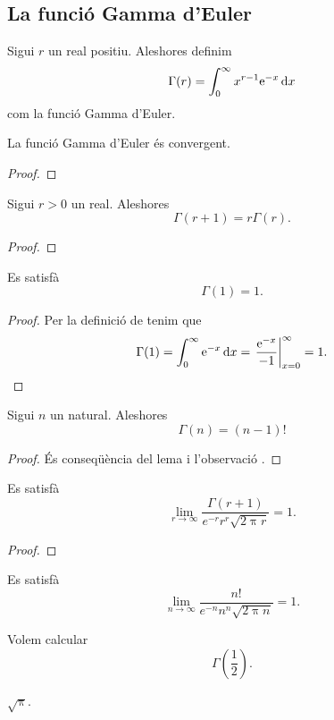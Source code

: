 \documentclass[../../Main.tex]{subfiles}
\begin{document}
	\subsection{La funció Gamma d'Euler}
	\begin{definition}
		\label{def:Gamma d'Euler}
		Sigui \(r\) un real positiu. Aleshores definim
		\[\Gamma(r)=\int_{0}^{\infty}x^{r-1}\mathrm{e}^{-x}\mathop{}\!\mathrm{d} x\]
		com la funció Gamma d'Euler.
	\end{definition}
	\begin{theorem}
		\label{thm:la funció Gamma d'Euler és convergent}
		La funció Gamma d'Euler és convergent.
		\begin{proof}
		\end{proof}
	\end{theorem}
	\begin{lemma} %
		\label{lema:la Gamma d'Euler es comporta com un factorial amb reals}
		Sigui \(r>0\) un real. Aleshores
		\[\Gamma(r+1)=r\Gamma(r).\]
		\begin{proof}
		\end{proof}
	\end{lemma}
	\begin{observation}
		\label{obs:valor n=1 per la Gamma d'Euler}
		Es satisfà
		\[\Gamma(1)=1.\]
		\begin{proof} %
			Per la definició de  tenim que
			\[\Gamma(1)=\int_{0}^{\infty}\e^{-x}\diff x=\left.\frac{\e^{-x}}{-1}\right\vert_{x=0}^{\infty}=1.\qedhere\]
		\end{proof}
	\end{observation}
	\begin{lemma} %
		\label{lema:la Gamma d'Euler es comporta com un factorial}
		Sigui \(n\) un natural. Aleshores
		\[\Gamma(n)=(n-1)!\]
		\begin{proof}
			És conseqüència del lema  i l'observació .
		\end{proof}
	\end{lemma}
	\begin{theorem}
		\label{thm:fórmula d'Stirling}
		Es satisfà
		\[\lim_{r\to\infty}\frac{\Gamma(r+1)}{e^{-r}r^{r}\sqrt{2\uppi r}}=1.\]
		\begin{proof}
		\end{proof}
	\end{theorem}
	\begin{corollary}
		\label{cor:fórmula d'Stirling}
		Es satisfà
		\[\lim_{n\to\infty}\frac{n!}{e^{-n}n^{n}\sqrt{2\uppi n}}=1.\]
	\end{corollary}
	\begin{example}
		Volem calcular
		\[\Gamma\left(\frac{1}{2}\right).\]
		\begin{solution}
			\(\sqrt{\uppi}\). %
		\end{solution}
	\end{example}
\end{document}
